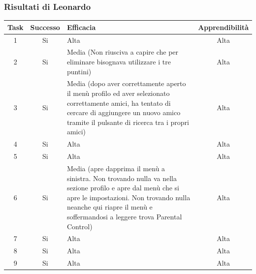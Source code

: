 \documentclass[../Report.tex]{subfiles}
\begin{document}
    \subsubsection{Risultati di Leonardo}
    \begin{table}[H]
        \begin{tabular}{|c|c|p{5cm}|c|}
            \hline
            Task & Successo & Efficacia & Apprendibilità \\
            \hline
            1 & Si & Alta & Alta \\
            \hline
            2 & Si & Media (Non riusciva a capire che per eliminare bisognava utilizzare i tre puntini) & Alta \\
            \hline
            3 & Si & Media (dopo aver correttamente aperto il menù profilo ed aver selezionato correttamente amici, ha tentato di cercare di aggiungere un nuovo amico tramite il pulsante di ricerca tra i propri amici) & Alta \\
            \hline
            4 & Si & Alta & Alta \\
            \hline
            5 & Si  & Alta  & Alta \\
            \hline
            6 & Si & Media (apre dapprima il menù a sinistra. Non trovando nulla va nella sezione profilo e apre dal menù che si apre le impostazioni. Non trovando nulla neanche qui riapre il menù e soffermandosi a leggere trova Parental Control)  & Alta \\
            \hline
            7 & Si & Alta & Alta \\
            \hline
            8 & Si & Alta & Alta \\
            \hline
            9 & Si & Alta & Alta \\
            \hline
        \end{tabular}

        
    \end{table}
\end{document}
